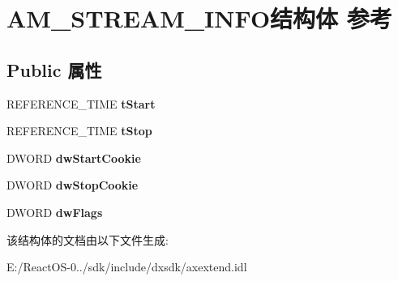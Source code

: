 \hypertarget{struct_a_m___s_t_r_e_a_m___i_n_f_o}{}\section{A\+M\+\_\+\+S\+T\+R\+E\+A\+M\+\_\+\+I\+N\+F\+O结构体 参考}
\label{struct_a_m___s_t_r_e_a_m___i_n_f_o}
\subsection*{Public 属性}
\begin{DoxyCompactItemize}
\item 
\mbox{\label{struct_a_m___s_t_r_e_a_m___i_n_f_o_a987958f539560600fb500cc42b4cc00f}} 
R\+E\+F\+E\+R\+E\+N\+C\+E\+\_\+\+T\+I\+ME {\bfseries t\+Start}
\item 
\mbox{\label{struct_a_m___s_t_r_e_a_m___i_n_f_o_a196798879614317a1698e41d98556b26}} 
R\+E\+F\+E\+R\+E\+N\+C\+E\+\_\+\+T\+I\+ME {\bfseries t\+Stop}
\item 
\mbox{\label{struct_a_m___s_t_r_e_a_m___i_n_f_o_ae1478a302eb04140be88047d3bfe9d89}} 
D\+W\+O\+RD {\bfseries dw\+Start\+Cookie}
\item 
\mbox{\label{struct_a_m___s_t_r_e_a_m___i_n_f_o_a898a232ebc2792ebfa7e271b6b361152}} 
D\+W\+O\+RD {\bfseries dw\+Stop\+Cookie}
\item 
\mbox{\label{struct_a_m___s_t_r_e_a_m___i_n_f_o_af9ef576f8bd0952bb73e7d69e0121776}} 
D\+W\+O\+RD {\bfseries dw\+Flags}
\end{DoxyCompactItemize}


该结构体的文档由以下文件生成\+:\begin{DoxyCompactItemize}
\item 
E\+:/\+React\+O\+S-\/0../sdk/include/dxsdk/axextend.\+idl\end{DoxyCompactItemize}
